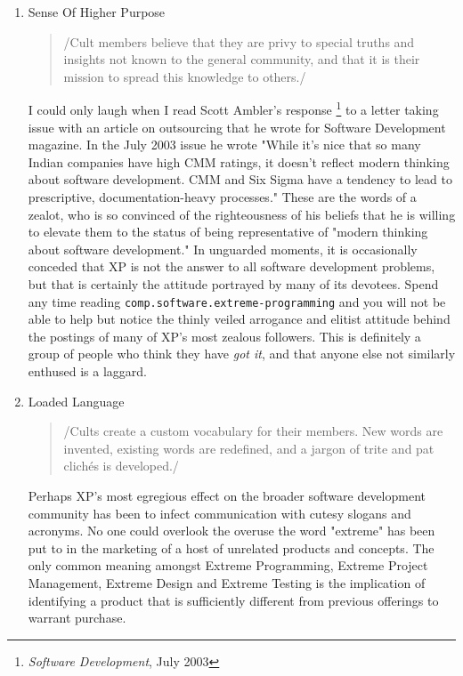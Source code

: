 \documentclass{article}
\begin{document}
\begin{enumerate}
\item Sense Of Higher Purpose
\label{sec:orgheadline190}

\begin{quote}
/Cult members believe that they are privy to special truths and
insights not known to the general community, and that it is their
mission to spread this knowledge to others./
\end{quote}

I could only laugh when I read Scott Ambler's response \footnote{\emph{Software Development}, July 2003} to a letter
taking issue with an article on outsourcing that he wrote for Software
Development magazine. In the July 2003 issue he wrote "While it's nice
that so many Indian companies have high CMM ratings, it doesn't reflect
modern thinking about software development. CMM and Six Sigma have a
tendency to lead to prescriptive, documentation-heavy processes." These
are the words of a zealot, who is so convinced of the righteousness of
his beliefs that he is willing to elevate them to the status of being
representative of "modern thinking about software development." In
unguarded moments, it is occasionally conceded that XP is not the answer
to all software development problems, but that is certainly the attitude
portrayed by many of its devotees. Spend any time reading
\texttt{comp.software.extreme-programming} and you will not be able to help but
notice the thinly veiled arrogance and elitist attitude behind the
postings of many of XP's most zealous followers. This is definitely a
group of people who think they have \emph{got it}, and that anyone else not
similarly enthused is a laggard.

\item Loaded Language
\label{sec:orgheadline191}

\begin{quote}
/Cults create a custom vocabulary for their members. New words are
invented, existing words are redefined, and a jargon of trite and pat
clichés is developed./
\end{quote}

Perhaps XP's most egregious effect on the broader software development
community has been to infect communication with cutesy slogans and
acronyms. No one could overlook the overuse the word "extreme" has been
put to in the marketing of a host of unrelated products and concepts.
The only common meaning amongst Extreme Programming, Extreme Project
Management, Extreme Design and Extreme Testing is the implication of
identifying a product that is sufficiently different from previous
offerings to warrant purchase.


\end{enumerate}
\end{document}
